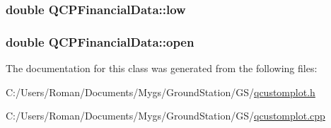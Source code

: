 \subsubsection[{low}]{\setlength{\rightskip}{0pt plus 5cm}double Q\+C\+P\+Financial\+Data\+::low}\label{class_q_c_p_financial_data_aecce0fb45a115e3f3a25eea78491ac16}
\hypertarget{class_q_c_p_financial_data_a3059e1e1fbcb9fd243fde0450f238032}{}
\subsubsection[{open}]{\setlength{\rightskip}{0pt plus 5cm}double Q\+C\+P\+Financial\+Data\+::open}\label{class_q_c_p_financial_data_a3059e1e1fbcb9fd243fde0450f238032}


The documentation for this class was generated from the following files\+:\begin{DoxyCompactItemize}
\item 
C\+:/\+Users/\+Roman/\+Documents/\+Mygs/\+Ground\+Station/\+G\+S/\hyperlink{qcustomplot_8h}{qcustomplot.\+h}\item 
C\+:/\+Users/\+Roman/\+Documents/\+Mygs/\+Ground\+Station/\+G\+S/\hyperlink{qcustomplot_8cpp}{qcustomplot.\+cpp}\end{DoxyCompactItemize}
